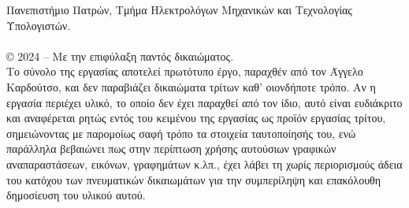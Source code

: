 \pagestyle{empty}

\vspace*{\fill}
\begin{flushleft}
	Πανεπιστήμιο Πατρών, Τμήμα Ηλεκτρολόγων Μηχανικών και Τεχνολογίας Υπολογιστών.\\
	{\nommeF} \\
	© 2024 -- Με την επιφύλαξη παντός δικαιώματος.\\
	Το σύνολο της εργασίας αποτελεί πρωτότυπο έργο, παραχθέν από τον Άγγελο Καρδούτσο, και δεν παραβιάζει δικαιώματα τρίτων καθ’ οιονδήποτε τρόπο. Αν η εργασία περιέχει υλικό, το οποίο δεν έχει παραχθεί από τον ίδιο, αυτό είναι ευδιάκριτο και αναφέρεται ρητώς εντός του κειμένου της εργασίας ως προϊόν εργασίας τρίτου, σημειώνοντας με παρομοίως σαφή τρόπο τα στοιχεία ταυτοποίησής του, ενώ παράλληλα βεβαιώνει πως στην περίπτωση χρήσης αυτούσιων γραφικών αναπαραστάσεων, εικόνων, γραφημάτων κ.λπ., έχει λάβει τη χωρίς περιορισμούς άδεια του κατόχου των πνευματικών δικαιωμάτων για την συμπερίληψη και επακόλουθη δημοσίευση του υλικού αυτού.
\end{flushleft}
